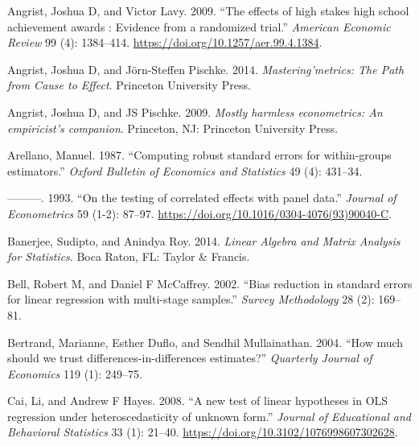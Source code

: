 \documentclass[12pt]{article}
\newlength{\cslhangindent}
\newlength{\cslentryspacingunit} %
\newenvironment{CSLReferences}[2] %
 {%
  \setlength{\parindent}{0pt}
  \ifodd #1
  \let\oldpar\par
  \def\par{\hangindent=\cslhangindent\oldpar}
  \fi
  \setlength{\parskip}{#2\cslentryspacingunit}
 }%
 {}
\begin{document}
\hypertarget{refs}{}
\begin{CSLReferences}{1}{0}
\leavevmode{}%
Angrist, Joshua D, and Victor Lavy. 2009. {``{The effects of high stakes
high school achievement awards : Evidence from a randomized trial}.''}
\emph{American Economic Review} 99 (4): 1384--414.
\url{https://doi.org/10.1257/aer.99.4.1384}.

\leavevmode{}%
Angrist, Joshua D, and Jörn-Steffen Pischke. 2014.
\emph{Mastering'metrics: The Path from Cause to Effect}. Princeton
University Press.

\leavevmode{}%
Angrist, Joshua D, and JS Pischke. 2009. \emph{{Mostly harmless
econometrics: An empiricist's companion}}. Princeton, NJ: Princeton
University Press.

\leavevmode{}%
Arellano, Manuel. 1987. {``{Computing robust standard errors for
within-groups estimators}.''} \emph{Oxford Bulletin of Economics and
Statistics} 49 (4): 431--34.

\leavevmode{}%
---------. 1993. {``{On the testing of correlated effects with panel
data}.''} \emph{Journal of Econometrics} 59 (1-2): 87--97.
\url{https://doi.org/10.1016/0304-4076(93)90040-C}.

\leavevmode{}%
Banerjee, Sudipto, and Anindya Roy. 2014. \emph{{Linear Algebra and
Matrix Analysis for Statistics}}. Boca Raton, FL: Taylor \& Francis.

\leavevmode{}%
Bell, Robert M, and Daniel F McCaffrey. 2002. {``{Bias reduction in
standard errors for linear regression with multi-stage samples}.''}
\emph{Survey Methodology} 28 (2): 169--81.

\leavevmode{}%
Bertrand, Marianne, Esther Duflo, and Sendhil Mullainathan. 2004.
{``{How much should we trust differences-in-differences estimates?}''}
\emph{Quarterly Journal of Economics} 119 (1): 249--75.

\leavevmode{}%
Cai, Li, and Andrew F Hayes. 2008. {``{A new test of linear hypotheses
in OLS regression under heteroscedasticity of unknown form}.''}
\emph{Journal of Educational and Behavioral Statistics} 33 (1): 21--40.
\url{https://doi.org/10.3102/1076998607302628}.


\end{CSLReferences}
\end{document}
